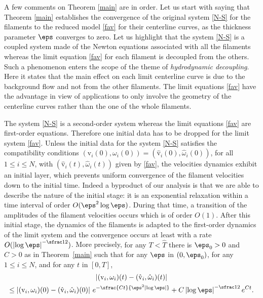 A few comments on Theorem \ref{main} are in order. Let us start with saying that Theorem \ref{main} establishes the convergence of the original system \eqref{N-S} for the filaments to the reduced model \eqref{fav} for their centerline curves, as the thickness parameter $\eps$ converges to zero. Let us highlight that the system \eqref{N-S} is a coupled system made of the Newton equations associated with all the filaments whereas the limit equation \eqref{fav} for each filament is decoupled from the others. Such a phenomenon enters the scope
of the theme of \textit{hydrodynamic decoupling}. Here it states that the main effect on each limit centerline curve is due to the background flow and not from the other filaments. The limit equations \eqref{fav} have the advantage in view of applications to only involve the geometry of the centerline curves rather than the one of the whole filaments.

The system \eqref{N-S} is a second-order system whereas the limit equations \eqref{fav} are {first-order equations}. Therefore one initial data has to be dropped for the limit system \eqref{fav}. Unless
the initial data for the system \eqref{N-S} satisfies the compatibility conditions $(\textrm{v}_i (0),\omega_i (0)) = (\hat{\textrm{v}}_i(0),{\hat \omega}_i (0))$, for all $1 \leq i \leq N$, with $(\hat{\textrm{v}}_i(t),{\hat \omega}_i (t))$ given by \eqref{fav},
the velocities dynamics exhibit {an} initial layer, which prevents
uniform convergence of the filament velocities down to the initial time.
Indeed a byproduct of our analysis is that
we are able to describe the nature of the initial stage: it is an exponential relaxation within a time interval of order
$O(\eps^2 \log \eps)${. During that} time,
a transition of the amplitudes of the filament velocities occurs which is of order $O(1)$. After this initial stage, the dynamics of the filaments is adapted to the first-order dynamics of the limit system and the convergence occurs at least with a rate $O(\left|\log \eps \right|^{-\sfrac12})$.
More precisely, {for any $T < \hat T$ there is $\eps_0 > 0$ and $C>0$ as in Theorem~\ref{main}} such that for any $\eps $ in $(0,\eps_0)$, for any $1 \leq i \leq N$, and for any $t$ in $[0,T]$,%
\begin{multline}
\left| ({\textrm{v}}_i,\omega_{i})(t) - ({\hat {\textrm{v}}}_i, \hat \omega_i) (t) \right|\\
\leq \left| (\textrm{v}_i,\omega_i) (0)-
(\hat{\textrm{v}}_i,{\hat \omega}_i) (0) \right| \, e^{- \sfrac{C t}{\eps^2 \left|\log \eps\right|}} + C \left|\log \eps\right|^{-\sfrac12} e^{Ct}. \label{allezesti}
\end{multline}

